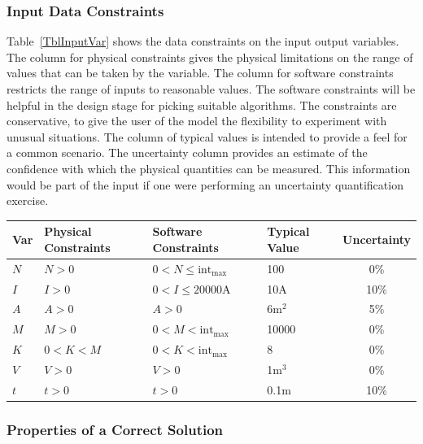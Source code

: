 \documentclass[12pt]{article}
\begin{document}
\subsubsection{Input Data Constraints} \label{sec_DataConstraints}    
Table~\ref{TblInputVar} shows the data constraints on the input output
variables.  The column for physical constraints gives the physical limitations
on the range of values that can be taken by the variable.  The column for
software constraints restricts the range of inputs to reasonable values.  The
software constraints will be helpful in the design stage for picking suitable
algorithms.  The constraints are conservative, to give the user of the model the
flexibility to experiment with unusual situations.  The column of typical values
is intended to provide a feel for a common scenario.  The uncertainty column
provides an estimate of the confidence with which the physical quantities can be
measured.  This information would be part of the input if one were performing an
uncertainty quantification exercise.

\begin{table}[!h]
  \caption{Input Variables} \label{TblInputVar}
  \renewcommand{\arraystretch}{1.2}
\noindent \begin{longtable*}{l l l l c} 
  \toprule
  \textbf{Var} & \textbf{Physical Constraints} & \textbf{Software Constraints} &
                             \textbf{Typical Value} & \textbf{Uncertainty}\\
  \midrule 
  $N$ & $N > 0$ & $0 < N \leq \text{int}_{\text{max}}$ & 100 & 0\%
  \\
  $I$ & $I > 0$ & $0 < I \leq 20000 \text{A}$ & 10A & 10\%
  \\
  $A$ & $A > 0$ & $A > 0$ & 6m$^2$ & 5\%
  \\
  $M$ & $M > 0$ & $0 < M < \text{int}_\text{max}$ & 10000 & 0\%
  \\
  $K$ & $0 < K < M$ & $0 < K < \text{int}_\text{max}$ & 8 & 0\%
  \\
  $V$ & $V > 0$ & $V > 0$ & 1m$^3$ & 0\%
  \\
  $t$ & $t > 0$ & $t > 0$ & 0.1m & 10\%
  \\
  \bottomrule
\end{longtable*}
\end{table}

\subsubsection{Properties of a Correct Solution} \label{sec_CorrectSolution}
\end{document}
